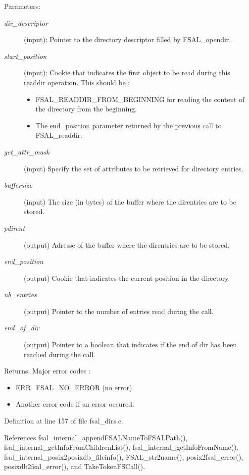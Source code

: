 \begin{Desc}
\item[Parameters:]
\begin{description}
\item[{\em dir\_\-descriptor}](input): Pointer to the directory descriptor filled by FSAL\_\-opendir. \item[{\em start\_\-position}](input): Cookie that indicates the first object to be read during this readdir operation. This should be :\begin{itemize}
\item FSAL\_\-READDIR\_\-FROM\_\-BEGINNING for reading the content of the directory from the beginning.\item The end\_\-position parameter returned by the previous call to FSAL\_\-readdir. \end{itemize}
\item[{\em get\_\-attr\_\-mask}](input) Specify the set of attributes to be retrieved for directory entries. \item[{\em buffersize}](input) The size (in bytes) of the buffer where the direntries are to be stored. \item[{\em pdirent}](output) Adresse of the buffer where the direntries are to be stored. \item[{\em end\_\-position}](output) Cookie that indicates the current position in the directory. \item[{\em nb\_\-entries}](output) Pointer to the number of entries read during the call. \item[{\em end\_\-of\_\-dir}](output) Pointer to a boolean that indicates if the end of dir has been reached during the call.\end{description}
\end{Desc}
\begin{Desc}
\item[Returns:]Major error codes :\begin{itemize}
\item ERR\_\-FSAL\_\-NO\_\-ERROR (no error)\item Another error code if an error occured. \end{itemize}
\end{Desc}


Definition at line 157 of file fsal\_\-dirs.c.

References fsal\_\-internal\_\-append\-FSALName\-To\-FSALPath(), fsal\_\-internal\_\-get\-Info\-From\-Children\-List(), fsal\_\-internal\_\-get\-Info\-From\-Name(), fsal\_\-internal\_\-posix2posixdb\_\-fileinfo(), FSAL\_\-str2name(), posix2fsal\_\-error(), posixdb2fsal\_\-error(), and Take\-Token\-FSCall().